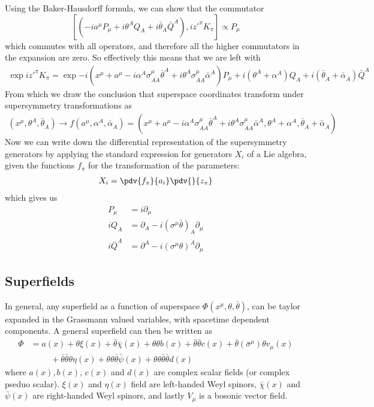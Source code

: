 Using the Baker-Hausdorff formula, we can show that the commutator $$[(-ia^{\mu}P_{\mu}+i\theta^{A}Q_{A}+i\bar{\theta}_{\dot{A}}\bar{Q}^{\dot{A}}),iz'^{\pi}K_{\pi}]\propto P_{\mu}$$
which commutes with all operators, and therefore all the higher commutators in the expansion are zero. So effectively this means that we are left with
\begin{align*}
    \exp{iz'^{\pi}K_{\pi}}=\exp{-i(x^{\mu}+a^{\mu}-i\alpha^{A}\sigma^{\mu}_{A\dot{A}}\bar{\theta}^{\dot{A}}+i\theta^{A}\sigma^{\mu}_{A\dot{A}}\bar{\alpha}^{\dot{A}})P_{\mu}+i(\theta^{A}+\alpha^{A})Q_{A}+i(\bar{\theta}_{\dot{A}}+\bar{\alpha}_{\dot{A}})\bar{Q}^{\dot{A}}}
\end{align*}
From which we draw the conclusion that superspace coordinates transform under supersymmetry transformations as
\begin{align*}
    (x^{\mu},\theta^{A},\bar{\theta}_{\dot{A}})\rightarrow f(a^{\mu},\alpha^{A},\bar{\alpha}_{\dot{A}})=(x^{\mu}+a^{\mu}-i\alpha^{A}\sigma^{\mu}_{A\dot{A}}\bar{\theta}^{\dot{A}}+i\theta^{A}\sigma^{\mu}_{A\dot{A}}\bar{\alpha}^{\dot{A}},\theta^{A}+\alpha^{A},\bar{\theta}_{\dot{A}}+\bar{\alpha}_{\dot{A}})
\end{align*}
Now we can write down the differential representation of the supersymmetry generators by applying the standard expression for generators $X_i$ of a Lie algebra, given the functions $f_{\pi}$ for the transformation of the parameters:
\begin{align*}
    X_{i}=\pdv{f_{\pi}}{a_i}\pdv{}{z_{\pi}}
\end{align*}
which gives us
\begin{align*}
    P_{\mu}&=i\partial_{\mu}
    \\
    iQ_{A}&=\partial_{A}-i(\sigma^{\mu}\bar{\theta})_{A}\partial_{\mu}
    \\
    i\bar{Q}^{\dot{A}}&=\partial^{\dot{A}}-i(\sigma^{\mu}\theta)^{\dot{A}}\partial_{\mu}
\end{align*}


\subsection{Superfields}
In general, any superfield as a function of superspace $\Phi(x^{\mu},\theta,\bar{\theta})$, can be taylor expanded in the Grassmann valued variables, with spacetime dependent components. A general superfield can then be written as
\begin{align}
    \Phi &= a(x)+\theta\xi(x)+ \bar{\theta}\bar{\chi}(x)+\theta\theta b(x)+\bar{\theta}\bar{\theta} c(x)+\bar{\theta}(\bar{\sigma}^{\mu})\theta v_{\mu}(x)\nonumber
    \\
    &\hspace{1cm}+\bar{\theta}\bar{\theta}\theta\eta(x)+\theta\theta\bar{\theta}\bar{\psi}(x)+\theta\theta\bar{\theta}\bar{\theta}d(x)
\end{align}
where $a(x), b(x)$, $c(x)$ and $d(x)$ are complex scalar fields (or complex pseduo scalar). $\xi(x)$ and $\eta(x)$ field are left-handed Weyl spinors, $\bar{\chi}(x)$ and $\bar{\psi}(x)$ are right-handed Weyl spinors, and lastly $V_{\mu}$ is a bosonic vector field.

